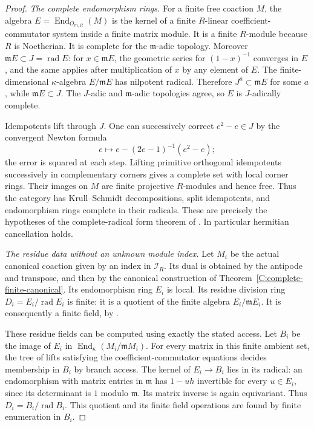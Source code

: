 \begin{proof}
\emph{The complete endomorphism rings.}
For a finite free coaction $M$, the algebra
$E=\operatorname{End}_{O_{m,R}}(M)$ is the kernel of
a finite $R$-linear coefficient-commutator system
inside a finite matrix module. It is a finite
$R$-module because $R$ is Noetherian. It is complete
for the $\mathfrak m$-adic topology.
Moreover $\mathfrak mE\subset J=\operatorname{rad}E$:
for $x\in\mathfrak mE$, the geometric series for
$(1-x)^{-1}$ converges in $E$, and the same applies
after multiplication of $x$ by any element of $E$.
The finite-dimensional $\kappa$-algebra $E/\mathfrak mE$
has nilpotent radical. Therefore
$J^a\subset\mathfrak mE$ for some $a$, while
$\mathfrak mE\subset J$.
The $J$-adic and $\mathfrak m$-adic topologies agree,
so $E$ is $J$-adically complete.

Idempotents lift through $J$. One can successively
correct $e^2-e\in J$ by the convergent Newton formula
\[
          e\longmapsto e-(2e-1)^{-1}(e^2-e);
\]
the error is squared at each step.
Lifting primitive orthogonal idempotents successively
in complementary corners gives a complete set with
local corner rings. Their images on $M$ are finite
projective $R$-modules and hence free.
Thus the category has Krull--Schmidt decompositions,
split idempotents, and endomorphism rings complete
in their radicals. These are precisely the hypotheses
of the complete-radical form theorem of
\cite[Theorem 2.2, Corollary 2.3, Propositions 2.4--2.5,
Theorems 3.2--3.3, pp.\ 269--273]{C-QSS1979}.
In particular hermitian cancellation holds.

\emph{The residue data without an unknown module index.}
Let $M_i$ be the actual canonical coaction given by
an index in $\mathscr I_R$. Its dual is obtained
by the antipode and transpose, and then by the
canonical construction of
Theorem~\ref{C:complete-finite-canonical}.
Its endomorphism ring $E_i$ is local. Its residue
division ring $D_i=E_i/\operatorname{rad}E_i$ is finite:
it is a quotient of the finite algebra
$E_i/\mathfrak mE_i$.
It is consequently a finite field, by
\cite[Theorem III.4.4, p.\ 29]{C-ArtinFiniteDivision}.

These residue fields can be computed using exactly
the stated access. Let $B_i$ be the image of $E_i$
in $\operatorname{End}_\kappa(M_i/\mathfrak mM_i)$.
For every matrix in this finite ambient set, the tree
of lifts satisfying the coefficient-commutator
equations decides membership in $B_i$ by branch access.
The kernel of $E_i\to B_i$ lies in its radical:
an endomorphism with matrix entries in $\mathfrak m$
has $1-uh$ invertible for every $u\in E_i$, since
its determinant is $1$ modulo $\mathfrak m$.
Its matrix inverse is again equivariant.
Thus
$D_i=B_i/\operatorname{rad}B_i$.
This quotient and its finite field operations are
found by finite enumeration in $B_i$.


\end{proof}
